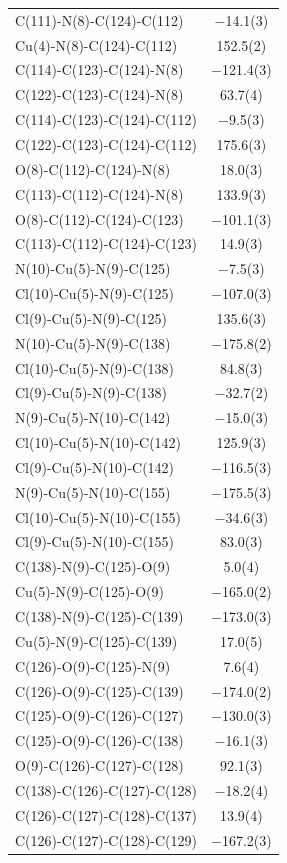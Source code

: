 \begin{center}
{\begin{supertabular}{p{1.8in}c}
C(111)-N(8)-C(124)-C(112)&$-$14.1(3)\\
Cu(4)-N(8)-C(124)-C(112)&152.5(2)\\
C(114)-C(123)-C(124)-N(8)&$-$121.4(3)\\
C(122)-C(123)-C(124)-N(8)&63.7(4)\\
C(114)-C(123)-C(124)-C(112)&$-$9.5(3)\\
C(122)-C(123)-C(124)-C(112)&175.6(3)\\
O(8)-C(112)-C(124)-N(8)&18.0(3)\\
C(113)-C(112)-C(124)-N(8)&133.9(3)\\
O(8)-C(112)-C(124)-C(123)&$-$101.1(3)\\
C(113)-C(112)-C(124)-C(123)&14.9(3)\\
N(10)-Cu(5)-N(9)-C(125)&$-$7.5(3)\\
Cl(10)-Cu(5)-N(9)-C(125)&$-$107.0(3)\\
Cl(9)-Cu(5)-N(9)-C(125)&135.6(3)\\
N(10)-Cu(5)-N(9)-C(138)&$-$175.8(2)\\
Cl(10)-Cu(5)-N(9)-C(138)&84.8(3)\\
Cl(9)-Cu(5)-N(9)-C(138)&$-$32.7(2)\\
N(9)-Cu(5)-N(10)-C(142)&$-$15.0(3)\\
Cl(10)-Cu(5)-N(10)-C(142)&125.9(3)\\
Cl(9)-Cu(5)-N(10)-C(142)&$-$116.5(3)\\
N(9)-Cu(5)-N(10)-C(155)&$-$175.5(3)\\
Cl(10)-Cu(5)-N(10)-C(155)&$-$34.6(3)\\
Cl(9)-Cu(5)-N(10)-C(155)&83.0(3)\\
C(138)-N(9)-C(125)-O(9)&5.0(4)\\
Cu(5)-N(9)-C(125)-O(9)&$-$165.0(2)\\
C(138)-N(9)-C(125)-C(139)&$-$173.0(3)\\
Cu(5)-N(9)-C(125)-C(139)&17.0(5)\\
C(126)-O(9)-C(125)-N(9)&7.6(4)\\
C(126)-O(9)-C(125)-C(139)&$-$174.0(2)\\
C(125)-O(9)-C(126)-C(127)&$-$130.0(3)\\
C(125)-O(9)-C(126)-C(138)&$-$16.1(3)\\
O(9)-C(126)-C(127)-C(128)&92.1(3)\\
C(138)-C(126)-C(127)-C(128)&$-$18.2(4)\\
C(126)-C(127)-C(128)-C(137)&13.9(4)\\
C(126)-C(127)-C(128)-C(129)&$-$167.2(3)\\

\end{supertabular}}
\end{center}
